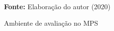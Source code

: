 \begin{figure}[ht!]
\centering

\caption{\textmd{Ambiente de avaliação no \gls{MPS}}}
\label{fig:ambiente}

\par\medskip\textbf{Fonte:} Elaboração do autor (2020) \par\medskip

\end{figure}

